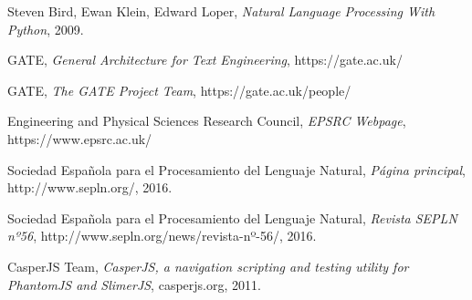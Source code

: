 \begin{thebibliography}{9}

  
  Steven Bird, Ewan Klein, Edward Loper,
  \emph{Natural Language Processing With Python},
  2009.

  GATE,
  \emph{General Architecture for Text Engineering},
  https://gate.ac.uk/
  
  GATE,
  \emph{The GATE Project Team},
  https://gate.ac.uk/people/

  Engineering and Physical Sciences Research Council,
  \emph{EPSRC Webpage},
  https://www.epsrc.ac.uk/

  Sociedad Española para el Procesamiento del Lenguaje Natural,
  \emph{Página principal},
  http://www.sepln.org/,
  2016.

  Sociedad Española para el Procesamiento del Lenguaje Natural,
  \emph{Revista SEPLN nº56},
  http://www.sepln.org/news/revista-nº-56/,
  2016.
  
  CasperJS Team,
  \emph{CasperJS, a navigation scripting and testing utility for PhantomJS and SlimerJS},
  casperjs.org,
  2011.
\end{thebibliography}